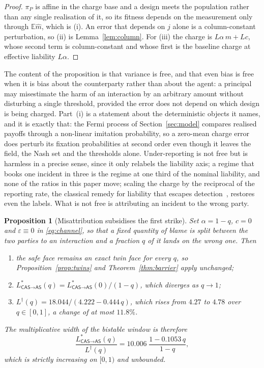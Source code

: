 \documentclass[pdflatex]{sn-jnl}
\theoremstyle{thmstyleone}
\newtheorem{proposition}[theorem]{Proposition}
\theoremstyle{thmstylethree}
\theoremstyle{thmstyletwo}
\newcommand{\AS}{\textsf{AS}}
\newcommand{\CAS}{\textsf{CAS}}
\newcommand{\piP}{\pi_{P}}
\begin{document}
\begin{proof}
$\piP$ is affine in the charge base and a design meets the population rather
than any single realisation of it, so its fitness depends on the measurement
only through $\mathbb{E}\hat m$, which is (i). An error that depends on $j$
alone is a column-constant perturbation, so (ii) is
Lemma~\ref{lem:column}. For (iii) the charge is $L\alpha\,m+Lc$, whose second
term is column-constant and whose first is the baseline charge at effective
liability $L\alpha$.
\end{proof}

The content of the proposition is that variance is free, and that even bias is
free when it is bias about the counterparty rather than about the agent: a
principal may misestimate the harm of an interaction by an arbitrary amount
without disturbing a single threshold, provided the error does not depend on
which design is being charged. Part~(i) is a statement about the deterministic
objects it names, and it is exactly that: the Fermi process of
Section~\ref{sec:model} compares realised payoffs through a non-linear
imitation probability, so a zero-mean charge error does perturb its fixation
probabilities at second order even though it leaves the field, the Nash set
and the thresholds alone. Under-reporting is not free but is harmless in
a precise sense, since it only relabels the liability axis; a regime that
books one incident in three is the regime at one third of the nominal
liability, and none of the ratios in this paper move; scaling the charge by
the reciprocal of the reporting rate, the classical remedy for liability that
escapes detection~\citep{polinsky1998punitive}, restores even the labels. What
is not free is
attributing an incident to the wrong party.

\begin{proposition}[Misattribution subsidises the first strike]
\label{prop:misattr}
Set $\alpha=1-q$, $c=0$ and $\varepsilon\equiv0$ in \eqref{eq:channel}, so
that a fixed quantity of blame is split between the two parties to an
interaction and a fraction $q$ of it lands on the wrong one. Then
\begin{enumerate}
\item[(i)] the safe face remains an exact twin face for every $q$, so
Proposition~\ref{prop:twins} and Theorem~\ref{thm:barrier} apply unchanged;
\item[(ii)] $L^{*}_{\CAS\to\AS}(q)=L^{*}_{\CAS\to\AS}(0)/(1-q)$, which
diverges as $q\to1$;
\item[(iii)] $L^{\dagger}(q)=18.044/(4.222-0.444\,q)$, which rises from
$4.27$ to $4.78$ over $q\in[0,1]$, a change of at most $11.8\%$.
\end{enumerate}
The multiplicative width of the bistable window is therefore
\begin{equation}
\frac{L^{*}_{\CAS\to\AS}(q)}{L^{\dagger}(q)}
  =10.006\;\frac{1-0.1053\,q}{1-q},
\label{eq:qwindow}
\end{equation}
which is strictly increasing on $[0,1)$ and unbounded.
\end{proposition}
\end{document}
